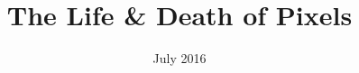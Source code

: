 \documentclass[10pt,fleqn]{article}
\title{The Life \& Death of Pixels}
\author{}
\date{July 2016}
\begin{document}
\maketitle










\newpage

\begin{appendix}


\end{appendix}


\newpage
\printbibliography
\end{document}
